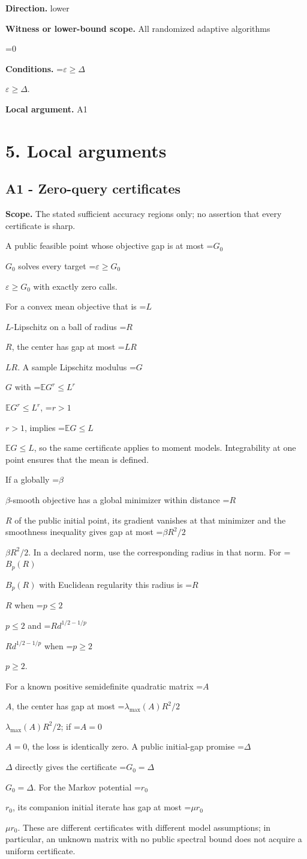 \documentclass[10pt,a4paper]{article}
\newcommand{\AtlasMath}[1]{\par\begingroup\centering\setbox0=\hbox{$\displaystyle #1$}\ifdim\wd0>1.4\linewidth\typeout{ATLAS WIDE FORMULA: \the\wd0}\fi\ifdim\wd0>\linewidth\resizebox{\linewidth}{!}{\box0}\else\box0\fi\par\endgroup}
\newcommand{\AtlasInlineMath}[1]{\begingroup\setbox0=\hbox{$#1$}\ifdim\wd0>.4\linewidth\endgroup\AtlasMath{#1}\else\endgroup$#1$\fi}
\begin{document}
\textbf{Direction.} lower

\textbf{Witness or lower-bound scope.} All randomized adaptive algorithms

\AtlasMath{0}
\textbf{Conditions.} \AtlasInlineMath{\varepsilon\ge \Delta}.

\textbf{Local argument.} A1

\section{5. Local arguments}
\subsection{A1 - Zero-query certificates}
\textbf{Scope.} The stated sufficient accuracy regions only; no assertion that every certificate is sharp.

A public feasible point whose objective gap is at most \AtlasInlineMath{G_0} solves every target \AtlasInlineMath{\varepsilon\ge G_0} with exactly zero calls.

For a convex mean objective that is \AtlasInlineMath{L}-Lipschitz on a ball of radius \AtlasInlineMath{R}, the center has gap at most \AtlasInlineMath{LR}. A sample Lipschitz modulus \AtlasInlineMath{G} with \AtlasInlineMath{\mathbb E G^r\le L^r}, \AtlasInlineMath{r>1}, implies \AtlasInlineMath{\mathbb E G\le L}, so the same certificate applies to moment models. Integrability at one point ensures that the mean is defined.

If a globally \AtlasInlineMath{\beta}-smooth objective has a global minimizer within distance \AtlasInlineMath{R} of the public initial point, its gradient vanishes at that minimizer and the smoothness inequality gives gap at most \AtlasInlineMath{\beta R^2/2}. In a declared norm, use the corresponding radius in that norm. For \AtlasInlineMath{B_p(R)} with Euclidean regularity this radius is \AtlasInlineMath{R} when \AtlasInlineMath{p\le2} and \AtlasInlineMath{R d^{1/2-1/p}} when \AtlasInlineMath{p\ge2}.

For a known positive semidefinite quadratic matrix \AtlasInlineMath{A}, the center has gap at most \AtlasInlineMath{\lambda_{\max}(A)R^2/2}; if \AtlasInlineMath{A=0}, the loss is identically zero. A public initial-gap promise \AtlasInlineMath{\Delta} directly gives the certificate \AtlasInlineMath{G_0=\Delta}. For the Markov potential \AtlasInlineMath{r_0}, its companion initial iterate has gap at most \AtlasInlineMath{\mu r_0}. These are different certificates with different model assumptions; in particular, an unknown matrix with no public spectral bound does not acquire a uniform certificate.
\end{document}
